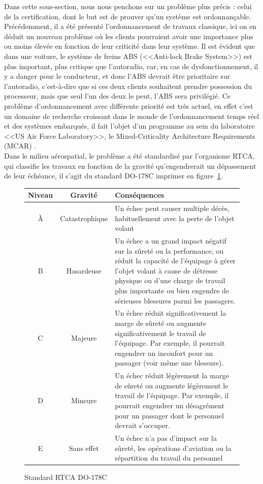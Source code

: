 \documentclass[a4paper]{report}
\theoremstyle{break}
\begin{document}
Dans cette sous-section, nous nous penchons sur un problème plus précis : celui de la certification, dont le but est de prouver qu'un système est ordonnançable.\\

Précédemment, il a été présenté l'ordonnancement de travaux classique, ici on en déduit un nouveau problème où les clients pourraient avoir une importance plus ou moins élevée en fonction de leur criticité dans leur système. 
Il est évident que dans une voiture, le système de freins ABS (<<Anti-lock Brake System>>) est plus important, plus critique que l'autoradio, car, en cas de dysfonctionnement, il y a danger pour le conducteur, et donc l'ABS devrait être prioritaire sur l'autoradio, c'est-à-dire que si ces deux clients souhaitent prendre possession du processeur, mais que seul l'un des deux le peut, l'ABS sera privilégié. Ce problème d'ordonnancement avec différente priorité est très actuel, en effet c'est un domaine de recherche croissant dans le monde de l'ordonnancement temps réel et des systèmes embarqués, il fait l'objet d'un programme au sein du laboratoire <<US Air Force Laboratory>>, le Mixed-Criticality Architecture Requirements (MCAR) \cite{de2009scheduling}.\\
Dans le milieu aérospatial, le problème a été standardisé par l'organisme RTCA, qui classifie les travaux en fonction de la gravité qu'engendrerait un dépassement de leur échéance, il s'agit du standard DO-178C imprimer en figure~\ref{do178}.\\
\begin{figure}[h]
\begin{tabularx}{\textwidth}{|c|c|X|}
\hline
Niveau & Gravité & Conséquences\\
\hline
À & Catastrophique & Un échec peut causer multiple décès, habituellement avec la perte de l'objet volant\\
\hline
B & Hasardeuse & Un échec a un grand impact négatif sur la sûreté ou la performance, ou réduit la capacité de l'équipage à gérer l'objet volant à cause de détresse physique ou d'une charge de travail plus importante ou bien engendre de sérieuses blessures parmi les passagers.\\
\hline
C & Majeure & Un échec réduit significativement la marge de sûreté ou augmente significativement le travail de l'équipage. Par exemple, il pourrait engendrer un inconfort pour un passager (voir même une blessure).\\
\hline
D & Mineure & Un échec réduit légèrement la marge de sûreté ou augmente légèrement le travail de l'équipage. Par exemple, il pourrait engendrer un désagrément pour un passager dont le personnel devrait s'occuper.\\
\hline
E & Sans effet & Un échec n'a pas d'impact sur la sûreté, les opérations d'aviation ou la répartition du travail du personnel\\
\hline
\end{tabularx}
\caption{Standard RTCA DO-178C \cite{nordhoff2012do178}}
\label{do178}
\end{figure}
\end{document}
